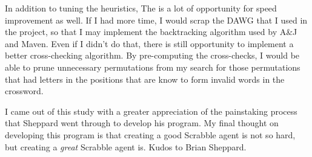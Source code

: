 \documentclass[letterpaper]{article}
\begin{document}
In addition to tuning the heuristics, The is a lot of opportunity for speed improvement as well. If I had more time, I would scrap the DAWG that I used in the project, so that I may implement the backtracking algorithm used by  A\&J and Maven. Even if I didn't do that, there is still opportunity to implement a better cross-checking algorithm. By pre-computing the cross-checks, I would be able to prune unnecessary permutations from my search for those permutations that had letters in the positions that are know to form invalid words in the crossword.

I came out of this study with a greater appreciation of the painstaking process that Sheppard went through to develop his program. My final thought on developing this program is that creating a good Scrabble agent is not so hard, but creating a \emph{great} Scrabble agent is. Kudos to Brian Sheppard.




\end{document}
